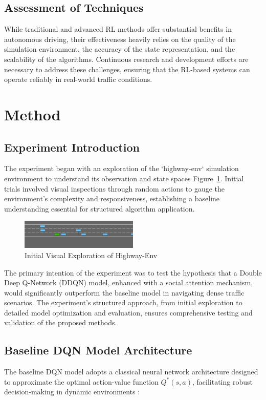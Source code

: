 \documentclass{article}
\begin{document}
\subsection{Assessment of Techniques}
While traditional and advanced RL methods offer substantial benefits in autonomous driving, their effectiveness heavily relies on the quality of the simulation environment, the accuracy of the state representation, and the scalability of the algorithms. Continuous research and development efforts are necessary to address these challenges, ensuring that the RL-based systems can operate reliably in real-world traffic conditions.

\section{Method}

\subsection{Experiment Introduction}
The experiment began with an exploration of the `highway-env` simulation environment to understand its observation and state spaces Figure~\ref{fig:initial_visual_inspection}. Initial trials involved visual inspections through random actions to gauge the environment's complexity and responsiveness, establishing a baseline understanding essential for structured algorithm application.

\begin{figure}[ht]
  \centering
  \includegraphics[width=0.5\textwidth]{./figures/highway_simulation_frame7.png}
  \caption{Initial Visual Exploration of Highway-Env}
  \label{fig:initial_visual_inspection}
\end{figure}

The primary intention of the experiment was to test the hypothesis that a Double Deep Q-Network (DDQN) model, enhanced with a social attention mechanism, would significantly outperform the baseline model in navigating dense traffic scenarios.
The experiment's structured approach, from initial exploration to detailed model optimization and evaluation, ensures comprehensive testing and validation of the proposed methods.

\subsection{Baseline DQN Model Architecture}
The baseline DQN model adopts a classical neural network architecture designed to approximate the optimal action-value function \( Q^*(s, a) \), facilitating robust decision-making in dynamic environments \citep{mnih2015humanlevel}:
\end{document}
